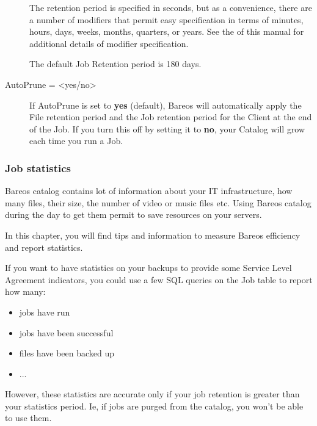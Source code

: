 \begin{description}
The retention period is specified in seconds, but as a convenience, there
are a number of modifiers that permit easy specification in terms of
minutes, hours, days, weeks, months, quarters, or years.
See the  of this manual for additional details of
modifier specification.

The default Job Retention period is 180 days.

\item [AutoPrune = {\textless}yes/no{\textgreater}]
   If AutoPrune is set to  {\bf yes} (default), Bareos will  automatically apply
the File retention period and the Job  retention period for the Client at the
end of the Job.
If you turn this off by setting it to {\bf no}, your  Catalog will grow each
time you run a Job.
\end{description}


\subsubsection{Job statistics}

\label{UseBareosCatalogToExtractInformationChapter}


Bareos catalog contains lot of information about your IT infrastructure, how
many files, their size, the number of video or music files etc. Using Bareos
catalog during the day to get them permit to save resources on your servers.

In this chapter, you will find tips and information to measure Bareos
efficiency and report statistics.

If you want to have statistics on your backups to
provide some Service Level Agreement indicators, you could use a few
SQL queries on the Job table to report how many:

\begin{itemize}
\item jobs have run
\item jobs have been successful
\item files have been backed up
\item ...
\end{itemize}

However, these statistics are accurate only if your job retention is greater
than your statistics period. Ie, if jobs are purged from the catalog, you won't
be able to use them.

